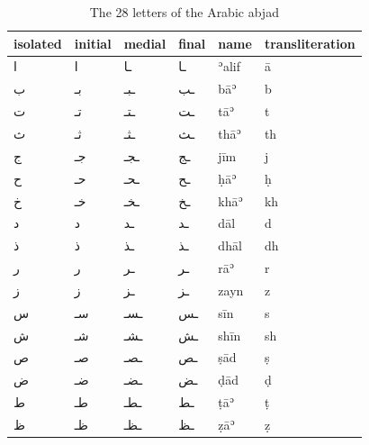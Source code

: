 \begin{table}[!htbp]
\begin{minipage}{\textwidth}
\begin{center}
\caption{The 28 letters of the Arabic abjad}
\label{tab:abjad}
\renewcommand*{\thefootnote}{\alph{footnote}}
\begin{tabularx}{\textwidth}{XXXXXp{2.6cm}} \toprule
\textbf{isolated} & \textbf{initial} & \textbf{medial} & \textbf{final} & \textbf{name} & \textbf{transliteration}\\
\midrule
\textarabic{ا} & \textarabic{ا} & \textarabic{ـا} & \textarabic{ـا} & ʾalif & ā\\
\textarabic{ب} & \textarabic{بـ} & \textarabic{ـبـ} & \textarabic{ـب} & bāʾ & b\\
\textarabic{ت} & \textarabic{تـ} & \textarabic{ـتـ} & \textarabic{ـت} & tāʾ & t\\
\textarabic{ث} & \textarabic{ثـ} & \textarabic{ـثـ} & \textarabic{ـث} & thāʾ & th\\
\textarabic{ج} & \textarabic{جـ} & \textarabic{ـجـ} & \textarabic{ـج} & jīm & j\\
\textarabic{ح} & \textarabic{حـ} & \textarabic{ـحـ} & \textarabic{ـح} & ḥāʾ & ḥ\\
\textarabic{خ} & \textarabic{خـ} & \textarabic{ـخـ} & \textarabic{ـخ} & khāʾ & kh\\
\textarabic{د} & \textarabic{د} & \textarabic{ـد} & \textarabic{ـد} & dāl & d\\
\textarabic{ذ} & \textarabic{ذ} & \textarabic{ـذ} & \textarabic{ـذ} & dhāl & dh\\
\textarabic{ر} & \textarabic{ر} & \textarabic{ـر} & \textarabic{ـر} & rāʾ & r\\
\textarabic{ز} & \textarabic{ز} & \textarabic{ـز} & \textarabic{ـز} & zayn & z\\
\textarabic{س} & \textarabic{سـ} & \textarabic{ـسـ} & \textarabic{ـس} & sīn & s\\
\textarabic{ش} & \textarabic{شـ} & \textarabic{ـشـ} & \textarabic{ـش} & shīn & sh\\
\textarabic{ص} & \textarabic{صـ} & \textarabic{ـصـ} & \textarabic{ـص} & ṣād & ṣ\\
\textarabic{ض} & \textarabic{ضـ} & \textarabic{ـضـ} & \textarabic{ـض} & ḍād & ḍ\\
\textarabic{ط} & \textarabic{طـ} & \textarabic{ـطـ} & \textarabic{ـط} & ṭāʾ & ṭ\\
\textarabic{ظ} & \textarabic{ظـ} & \textarabic{ـظـ} & \textarabic{ـظ} & ẓāʾ & ẓ\\

\end{tabularx}
\end{center}
\end{minipage}
\end{table}
